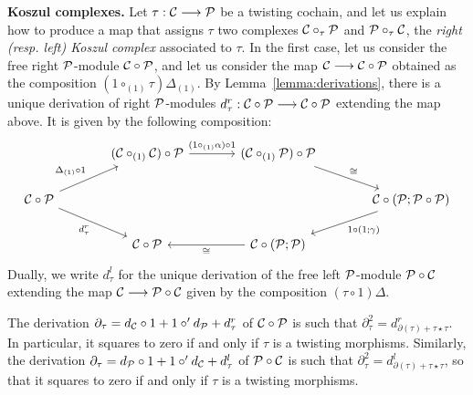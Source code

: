 \textbf{Koszul complexes.}
Let $\tau : \mathcal{C}\longrightarrow {\mathcal{P}}$ be a twisting cochain,
and let us explain how to produce a map that assigns $\tau$
two complexes $\mathcal{C}\circ_\tau {\mathcal{P}}$ and ${\mathcal{P}}\circ_\tau\mathcal{C}$, 
the \emph{right (resp. left) Koszul complex} associated to $\tau$.
In the first case, let us consider the free right ${\mathcal{P}}$-module
$\mathcal{C}\circ {\mathcal{P}}$, and let us consider the map
$\mathcal{C} \longrightarrow \mathcal{C}\circ {\mathcal{P}}$
obtained as the composition $(1\circ_{(1)} \tau)\Delta_{(1)}$.
By Lemma~\ref{lemma:derivations}, there is a unique derivation
of right ${\mathcal{P}}$-modules
$d_\tau^r : \mathcal{C}\circ {\mathcal{P}} \longrightarrow \mathcal{C}\circ {\mathcal{P}}$
extending the map above. It is given by the following composition:
\[
\begin{tikzcd}[column sep = large]
{} & (	\CC\circ_{(1)} \CC )\circ\PP \arrow[r,"(1\circ_{(1)}\alpha)\circ 1"] 
	& (	\CC\circ_{(1)} \PP )\circ
	\PP  \arrow[dr,"\cong"]\\ 
\CC\circ \PP \arrow[ur,"\Delta_{(1)}\circ 1"]\arrow[dr,"d_\tau^r",swap] & {} & {} & \CC\circ (\PP;\PP\circ\PP)\arrow[dl,"1\circ(1;\gamma)"]\\ 
{} &  \CC\circ \PP &  \CC\circ (\PP;\PP)\arrow[l,"\cong"] &{}
\end{tikzcd}
 \]
Dually, we write $d_\tau^l$ for the unique derivation of the free left 
${\mathcal{P}}$-module ${\mathcal{P}}\circ\mathcal{C}$ extending the map $\mathcal{C}\longrightarrow {\mathcal{P}}\circ \mathcal{C}$
given by the composition $(\tau\circ 1)\Delta$. 


\begin{proposition}
The derivation $\partial_\tau = d_{\mathcal{C}}\circ 1  + 1\circ' d_{\mathcal{P}} + d_\tau^r$
of $\mathcal{C}\circ {\mathcal{P}}$
is such that $\partial_\tau^2 = d_{\partial(\tau) + \tau\star\tau}^r$. In 
particular, it squares to zero if and only if $\tau$ is a twisting
morphisms. Similarly, the derivation  $\partial_\tau = d_{\mathcal{P}}\circ 1  + 1\circ' 
d_{\mathcal{C}} + d_\tau^l$ of ${\mathcal{P}}\circ \mathcal{C}$ is such that 
$\partial_\tau^2 = d_{\partial(\tau) + \tau\star\tau}^l$,
so that it squares to zero if and only if $\tau$ is a twisting
morphisms.
\end{proposition}

